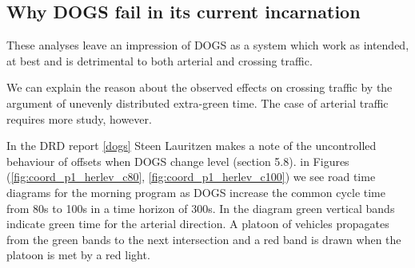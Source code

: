 \subsection*{Why DOGS fail in its current incarnation}
These analyses leave an impression of DOGS as a system which work as intended, at best and is detrimental to both arterial and crossing traffic.

We can explain the reason about the observed effects on crossing traffic by the argument of unevenly distributed extra-green time. The case of arterial traffic requires more study, however.

In the DRD report \ref{dogs} Steen Lauritzen makes a note of the uncontrolled behaviour of offsets when DOGS change level (section 5.8). in Figures (\ref{fig:coord_p1_herlev_c80}, \ref{fig:coord_p1_herlev_c100}) we see road time diagrams for the morning program as DOGS increase the common cycle time from 80s to 100s in a time horizon of 300s. 
In the diagram green vertical bands indicate green time for the arterial direction. A platoon of vehicles propagates from the green bands to the next intersection and a red band is drawn when the platoon is met by a red light.

